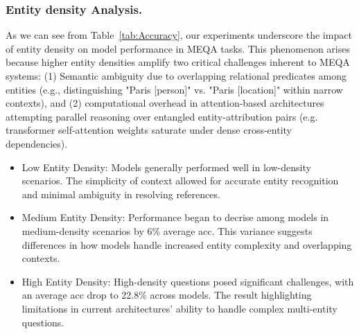 \subsubsection{Entity density Analysis.} 

As we can see from Table~\ref{tab:Accuracy}, our experiments underscore the impact of entity density on model performance in MEQA tasks. This phenomenon arises because higher entity densities amplify two critical challenges inherent to MEQA systems: (1) Semantic ambiguity due to overlapping relational predicates among entities (e.g., distinguishing "Paris [person]" vs. "Paris [location]" within narrow contexts), and (2) computational overhead in attention-based architectures attempting parallel reasoning over entangled entity-attribution  pairs (e.g. transformer self-attention weights saturate under dense cross-entity dependencies). 

\begin{itemize}
 \item {Low Entity Density}: Models generally performed well in low-density scenarios. The simplicity of context allowed for accurate entity recognition and minimal ambiguity in resolving references.
 \item {Medium Entity Density}: Performance began to decrise among models in medium-density scenarios by 6\% average acc. This variance suggests differences in how models handle increased entity complexity and overlapping contexts.
 \item {High Entity Density}: High-density questions posed significant challenges, with an average acc drop to 22.8\% across models. The result highlighting limitations in current architectures' ability to handle complex multi-entity questions. 
\end{itemize} 




